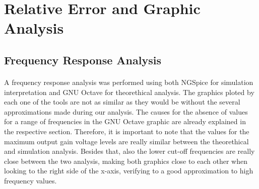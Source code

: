 \section{Relative Error and Graphic Analysis}
\label{error}

\subsection{Frequency Response Analysis}
\label{subsec:freqresp}

\paragraph{}
A frequency response analysis was performed using both NGSpice for simulation interpretation and GNU Octave for theorethical analysis. The graphics ploted by each one of the tools are not as similar as they would be without the several approximations made during our analysis. The causes for the absence of values for a range of frequencies in the GNU Octave graphic are already explained in the respective section. Therefore, it is important to note that the values for the maximum output gain voltage levels are really similar between the theorethical and simulation analysis. Besides that, also the lower cut-off frequencies are really close between the two analysis, making both graphics close to each other when looking to the right side of the x-axis, verifying to a good approximation to high frequency values. 

